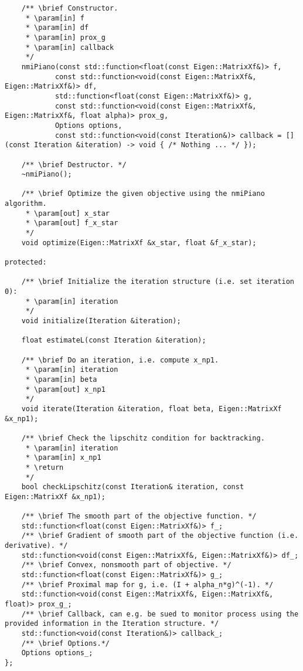 \documentclass[11pt]{article}
\begin{document}
\begin{lstlisting}
    /** \brief Constructor.
     * \param[in] f
     * \param[in] df
     * \param[in] prox_g
     * \param[in] callback
     */
    nmiPiano(const std::function<float(const Eigen::MatrixXf&)> f, 
            const std::function<void(const Eigen::MatrixXf&, Eigen::MatrixXf&)> df,
            std::function<float(const Eigen::MatrixXf&)> g,
            const std::function<void(const Eigen::MatrixXf&, Eigen::MatrixXf&, float alpha)> prox_g,
            Options options,
            const std::function<void(const Iteration&)> callback = [](const Iteration &iteration) -> void { /* Nothing ... */ });
            
    /** \brief Destructor. */
    ~nmiPiano();
    
    /** \brief Optimize the given objective using the nmiPiano algorithm. 
     * \param[out] x_star
     * \param[out] f_x_star
     */
    void optimize(Eigen::MatrixXf &x_star, float &f_x_star);
    
protected:
    
    /** \brief Initialize the iteration structure (i.e. set iteration 0): 
     * \param[in] iteration
     */
    void initialize(Iteration &iteration);
    
    float estimateL(const Iteration &iteration);
    
    /** \brief Do an iteration, i.e. compute x_np1.
     * \param[in] iteration
     * \param[in] beta
     * \param[out] x_np1
     */
    void iterate(Iteration &iteration, float beta, Eigen::MatrixXf &x_np1);
    
    /** \brief Check the lipschitz condition for backtracking.
     * \param[in] iteration
     * \param[in] x_np1
     * \return
     */
    bool checkLipschitz(const Iteration& iteration, const Eigen::MatrixXf &x_np1);
    
    /** \brief The smooth part of the objective function. */
    std::function<float(const Eigen::MatrixXf&)> f_;
    /** \brief Gradient of smooth part of the objective function (i.e. derivative). */
    std::function<void(const Eigen::MatrixXf&, Eigen::MatrixXf&)> df_;
    /** \brief Convex, nonsmooth part of objective. */
    std::function<float(const Eigen::MatrixXf&)> g_;
    /** \brief Proximal map for g, i.e. (I + alpha_n*g)^(-1). */
    std::function<void(const Eigen::MatrixXf&, Eigen::MatrixXf&, float)> prox_g_;
    /** \brief Callback, can e.g. be sued to monitor process using the provided information in the Iteration structure. */
    std::function<void(const Iteration&)> callback_;
    /** \brief Options.*/
    Options options_;
};


\end{lstlisting}
\end{document}
